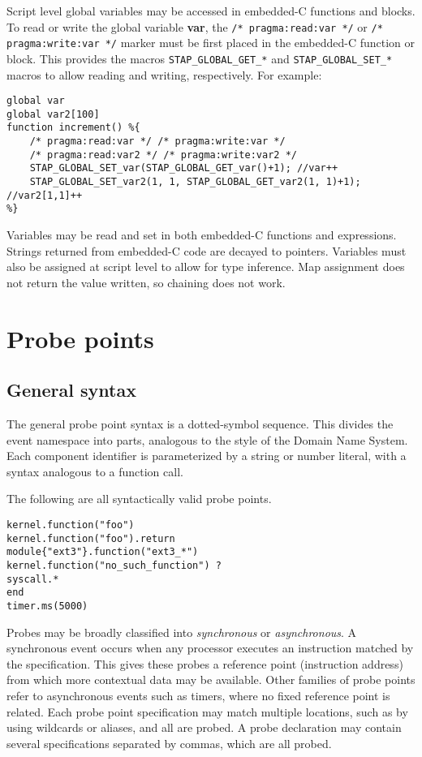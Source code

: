 \documentclass[twoside,english]{article}
\newenvironment{vindent}
{\begin{list}{}{\setlength{\listparindent}{6pt}}
\item[]}
{\end{list}}
\begin{document}
Script level global variables may be accessed in embedded-C functions and
blocks. To read or write the global variable \textbf{var}, the
\verb+/* pragma:read:var */+ or \verb+/* pragma:write:var */+
marker must be first placed in the embedded-C function or block. This provides
the macros \verb+STAP_GLOBAL_GET_*+ and \verb+STAP_GLOBAL_SET_*+
macros to allow reading and writing, respectively. For example:
\begin{vindent}
\begin{verbatim}
global var
global var2[100]
function increment() %{
    /* pragma:read:var */ /* pragma:write:var */
    /* pragma:read:var2 */ /* pragma:write:var2 */
    STAP_GLOBAL_SET_var(STAP_GLOBAL_GET_var()+1); //var++
    STAP_GLOBAL_SET_var2(1, 1, STAP_GLOBAL_GET_var2(1, 1)+1); //var2[1,1]++
%}
\end{verbatim}
\end{vindent}
Variables may be read and set in both embedded-C functions and expressions.
Strings returned from embedded-C code are decayed to pointers. Variables must
also be assigned at script level to allow for type inference. Map assignment
does not return the value written, so chaining does not work.

\section{Probe points\label{sec:Probe-Points}}
\subsection{General syntax}
The general probe point syntax is a dotted-symbol sequence. This divides
the event namespace into parts, analogous to the style of the Domain Name
System. Each component identifier is parameterized by a string or number
literal, with a syntax analogous to a function call.

The following are all syntactically valid probe points.

\begin{vindent}
\begin{verbatim}
kernel.function("foo")
kernel.function("foo").return
module{"ext3"}.function("ext3_*")
kernel.function("no_such_function") ?
syscall.*
end
timer.ms(5000)
\end{verbatim}
\end{vindent}

Probes may be broadly classified into \emph{synchronous}
or \emph{asynchronous}. A synchronous event occurs when
any processor executes an instruction matched by the specification. This
gives these probes a reference point (instruction address) from which more
contextual data may be available. Other families of probe points refer to
asynchronous events such as timers, where no fixed reference point is related.
Each probe point specification may match multiple locations, such as by using
wildcards or aliases, and all are probed. A probe declaration may contain
several specifications separated by commas, which are all probed.
\end{document}
